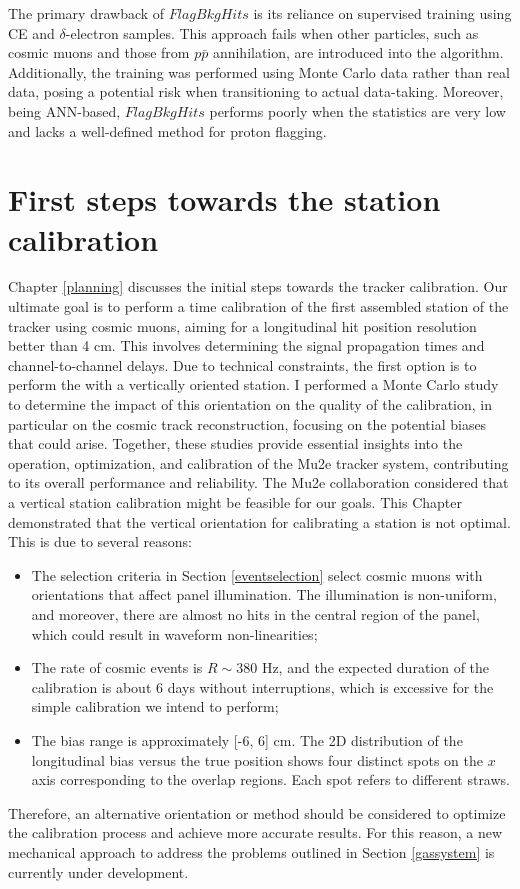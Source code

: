 The primary drawback of $FlagBkgHits$ is its reliance 
on supervised training using CE and $\delta$-electron samples. 
This approach fails when other particles, such as cosmic muons 
and those from $p\bar{p}$ annihilation, are introduced into the algorithm. 
Additionally, the training was performed using Monte Carlo data 
rather than real data, posing a potential risk when transitioning 
to actual data-taking. Moreover, being ANN-based, $FlagBkgHits$ 
performs poorly when the statistics are very low and lacks 
a well-defined method for proton flagging.

\section{First steps towards the station calibration}
Chapter \ref{planning} discusses the initial steps towards the tracker 
calibration. Our ultimate goal is to perform a time calibration of 
the first assembled station of the tracker using cosmic muons, aiming for a longitudinal hit 
position resolution better than 4 cm. This involves determining the signal 
propagation times and channel-to-channel delays. Due to technical constraints, the 
first option is to perform the with a vertically oriented station. I performed a 
Monte Carlo study to determine the impact of this orientation on the quality of the calibration, 
in particular on the cosmic track reconstruction, focusing on the 
potential biases that could arise. Together, 
these studies provide essential insights into the operation, optimization, 
and calibration of the Mu2e tracker system, contributing to its 
overall performance and reliability.
The Mu2e collaboration considered 
that a vertical station calibration might be 
feasible for our goals.
This Chapter demonstrated that the vertical orientation for calibrating a station is not optimal. This is due to several reasons:
\begin{itemize}
    \item The selection criteria in Section \ref{eventselection} select cosmic muons with orientations that affect panel illumination. 
    The illumination is non-uniform, and moreover, there are almost no hits in the central region of the panel, which could result in waveform non-linearities;
    \item The rate of cosmic events is $R \sim 380$ Hz, and the expected duration of the calibration is about 6 days without interruptions, 
    which is excessive for the simple calibration we intend to perform;
    \item The bias range is approximately [-6, 6] cm. The 2D distribution of the longitudinal bias versus the true position shows 
    four distinct spots on the $x$ axis corresponding to the overlap regions. Each spot refers to different straws.
\end{itemize}
Therefore, an alternative orientation or method should be considered to optimize the calibration process and achieve more accurate results.
For this reason, a new mechanical approach 
to address the problems outlined in Section \ref{gassystem}  
is currently under development.
